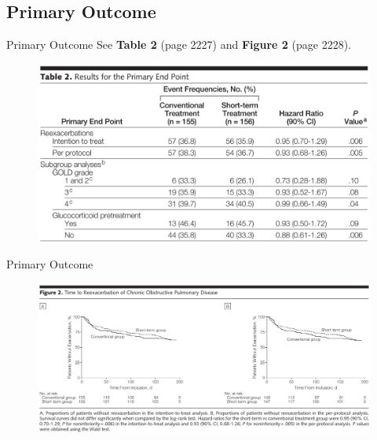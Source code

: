 \documentclass{beamer}
\begin{document}
	\subsection{Primary Outcome}
		\begin{frame}{Primary Outcome}
			See \textbf{Table 2} (page 2227) and \textbf{Figure 2} (page 2228).
			\begin{figure}
				\centering
				\includegraphics[width=1.0\linewidth]{../reports/figures/table2}
				\label{fig:table2}
			\end{figure}
		\end{frame}
		\begin{frame}{Primary Outcome}
			\begin{figure}
				\centering
				\includegraphics[width=1.0\textwidth]{../reports/figures/figure2}
				\label{fig:figure2}
			\end{figure}
		\end{frame}
\end{document}

